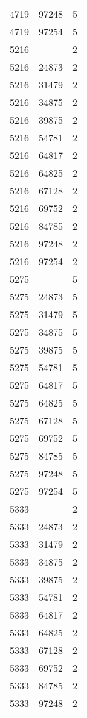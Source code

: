 {{\begin{tabular}{|c|c||c|}
4719&97248&5\\ 4719&97254&5\\ 5216& &2\\ 5216&24873&2\\ 5216&31479&2\\ 5216&34875&2\\ 5216&39875&2\\ 5216&54781&2\\ 5216&64817&2\\ 5216&64825&2\\ 5216&67128&2\\ 5216&69752&2\\ 5216&84785&2\\ 5216&97248&2\\ 5216&97254&2\\ 5275& &5\\ 5275&24873&5\\ 5275&31479&5\\ 5275&34875&5\\ 5275&39875&5\\ 5275&54781&5\\ 5275&64817&5\\ 5275&64825&5\\ 5275&67128&5\\ 5275&69752&5\\ 5275&84785&5\\ 5275&97248&5\\ 5275&97254&5\\ 5333& &2\\ 5333&24873&2\\ 5333&31479&2\\ 5333&34875&2\\ 5333&39875&2\\ 5333&54781&2\\ 5333&64817&2\\ 5333&64825&2\\ 5333&67128&2\\ 5333&69752&2\\ 5333&84785&2\\ 5333&97248&2\\ 
        \hline
        \end{tabular}
    }
}

